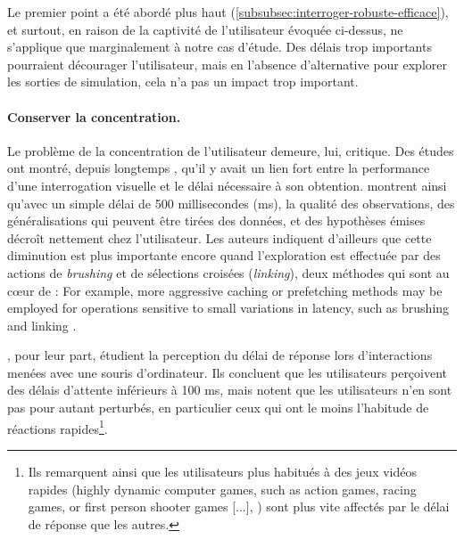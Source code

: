 Le premier point a été abordé plus haut (\cref{subsubsec:interroger-robuste-efficace}), et surtout, en raison de la \og captivité\fg{} de l'utilisateur évoquée ci-dessus, ne s'applique que marginalement à notre cas d'étude.
Des délais trop importants pourraient décourager l'utilisateur, mais en l'absence d'alternative pour explorer les sorties de simulation, cela n'a pas un impact trop important.

\paragraph{Conserver la concentration.}

Le problème de la concentration de l'utilisateur demeure, lui, critique.
Des études ont montré, depuis longtemps \autocite{mackenzie_lag_1993}, qu'il y avait un lien fort entre la performance d'une interrogation visuelle et le délai nécessaire à son obtention.
\textcite[8]{liu_effects_2014} montrent ainsi qu'avec un simple délai de 500 millisecondes (ms), la qualité des observations, des généralisations qui peuvent être tirées des données, et des hypothèses émises décroît nettement chez l'utilisateur.
Les auteurs indiquent d'ailleurs que cette diminution est plus importante encore quand l'exploration est effectuée par des actions de \textit{brushing} et de sélections croisées (\textit{linking}), deux méthodes qui sont au cœur de \simedb{} : \og For example, more aggressive caching or prefetching methods may be employed for operations sensitive to small variations in latency, such as brushing and linking \fg{} \autocite[9]{liu_effects_2014}.

\cite{forch_are_2017}, pour leur part, étudient la perception du délai de réponse lors d'interactions menées avec une souris d'ordinateur.
Ils concluent que les utilisateurs perçoivent des délais d'attente inférieurs à 100 ms, mais notent que les utilisateurs n'en sont pas pour autant perturbés, en particulier ceux qui ont le moins l'habitude de réactions rapides\footnote{
	Ils remarquent ainsi que les utilisateurs plus habitués à des jeux vidéos rapides (\og highly dynamic computer games, such as action games, racing games, or first person shooter games [...]\fg{}, \cite[51]{forch_are_2017}) sont plus vite affectés par le délai de réponse que les autres.
}.

